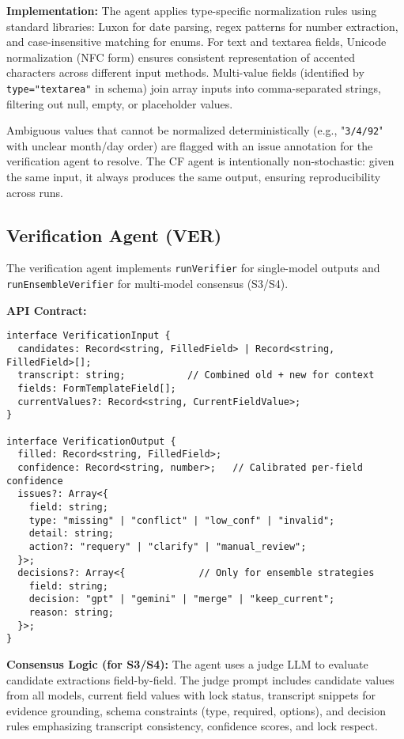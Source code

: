 \textbf{Implementation:} The agent applies type-specific normalization rules using standard libraries: Luxon for date parsing, regex patterns for number extraction, and case-insensitive matching for enums. For text and textarea fields, Unicode normalization (NFC form) ensures consistent representation of accented characters across different input methods. Multi-value fields (identified by \texttt{type="textarea"} in schema) join array inputs into comma-separated strings, filtering out null, empty, or placeholder values.

Ambiguous values that cannot be normalized deterministically (e.g., "\texttt{3/4/92}" with unclear month/day order) are flagged with an issue annotation for the verification agent to resolve. The CF agent is intentionally non-stochastic: given the same input, it always produces the same output, ensuring reproducibility across runs.

\subsection{Verification Agent (VER)}
\label{subsec:impl-ver}

The verification agent implements \texttt{runVerifier} for single-model outputs and \texttt{runEnsembleVerifier} for multi-model consensus (S3/S4).

\textbf{API Contract:}
\begin{verbatim}
interface VerificationInput {
  candidates: Record<string, FilledField> | Record<string, FilledField>[];
  transcript: string;           // Combined old + new for context
  fields: FormTemplateField[];
  currentValues?: Record<string, CurrentFieldValue>;
}

interface VerificationOutput {
  filled: Record<string, FilledField>;
  confidence: Record<string, number>;   // Calibrated per-field confidence
  issues?: Array<{
    field: string;
    type: "missing" | "conflict" | "low_conf" | "invalid";
    detail: string;
    action?: "requery" | "clarify" | "manual_review";
  }>;
  decisions?: Array<{             // Only for ensemble strategies
    field: string;
    decision: "gpt" | "gemini" | "merge" | "keep_current";
    reason: string;
  }>;
}
\end{verbatim}

\textbf{Consensus Logic (for S3/S4):} The agent uses a judge LLM to evaluate candidate extractions field-by-field. The judge prompt includes candidate values from all models, current field values with lock status, transcript snippets for evidence grounding, schema constraints (type, required, options), and decision rules emphasizing transcript consistency, confidence scores, and lock respect.

